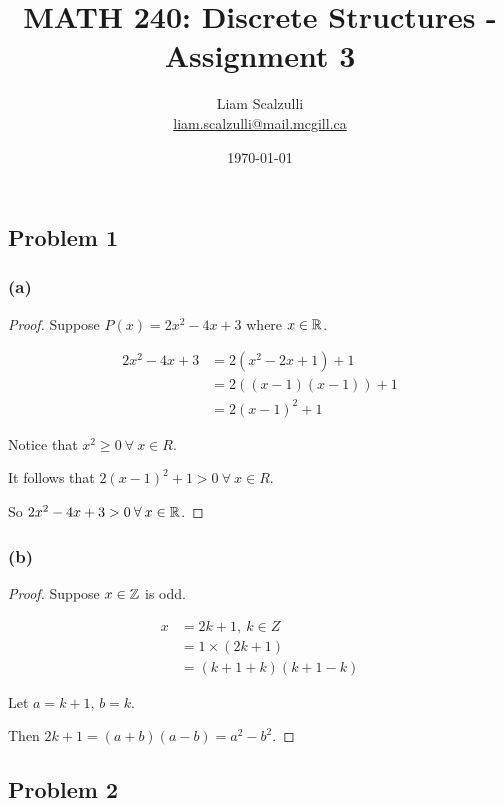 \documentclass[10pt]{article}
\title{MATH 240: Discrete Structures - Assignment 3}
\author{Liam Scalzulli\\
\href{mailto:liam.scalzulli@mail.mcgill.ca}{liam.scalzulli@mail.mcgill.ca}}
\date{\today}
\begin{document}
\maketitle

\subsection*{Problem 1}

\subsubsection*{(a)}

\begin{proof}
  Suppose $P(x) = 2x^2 - 4x + 3$ where $x \in \mathbb{R}$.

  \begin{align*}
    2x^2 - 4x + 3 &= 2(x^2 - 2x + 1) + 1 \\
      &= 2((x - 1)(x - 1)) + 1 \\
      &= 2(x - 1)^2 + 1
  \end{align*}

  \noindent
  Notice that $x^2 \ge 0 \: \forall \: x \in R$. \spacing
  
  \noindent
  It follows that $2(x - 1)^2 + 1 > 0 \: \forall \: x \in R$. \spacing

  \noindent
  So $2x^2 - 4x + 3 > 0 \: \forall \: x \in \mathbb{R}$.
\end{proof}

\subsubsection*{(b)}

\begin{proof}
  Suppose $x \in \mathbb{Z}$ is odd.

  \begin{align*}
    x &= 2k + 1, \: k \in Z \\
      &= 1 \times (2k + 1) \\
      &= (k + 1 + k)(k + 1 - k)
  \end{align*}

  \noindent
  Let $a = k + 1$, $b = k$. \spacing
  
  \noindent
  Then $2k + 1 = (a + b)(a - b) = a^2 - b^2.$
\end{proof}

\subsection*{Problem 2}
\end{document}
